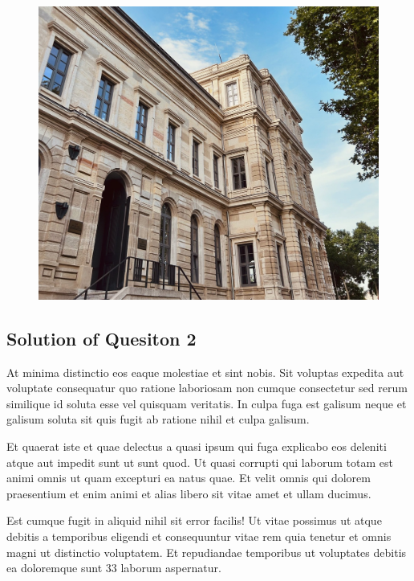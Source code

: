 \documentclass[11pt]{article}
\begin{document}
\begin{figure}[h!]
  \centering
  \includegraphics[width=1\linewidth]{figures/itu_example_photo.jpg}
\end{figure}

\subsection*{Solution of Quesiton 2}

At minima distinctio eos eaque molestiae et sint nobis. Sit voluptas expedita aut voluptate consequatur quo ratione laboriosam non cumque consectetur sed rerum similique id soluta esse vel quisquam veritatis. In culpa fuga est galisum neque et galisum soluta sit quis fugit ab ratione nihil et culpa galisum.

Et quaerat iste et quae delectus a quasi ipsum qui fuga explicabo eos deleniti atque aut impedit sunt ut sunt quod. Ut quasi corrupti qui laborum totam est animi omnis ut quam excepturi ea natus quae. Et velit omnis qui dolorem praesentium et enim animi et alias libero sit vitae amet et ullam ducimus.

Est cumque fugit in aliquid nihil sit error facilis! Ut vitae possimus ut atque debitis a temporibus eligendi et consequuntur vitae rem quia tenetur et omnis magni ut distinctio voluptatem. Et repudiandae temporibus ut voluptates debitis ea doloremque sunt 33 laborum aspernatur.
\end{document}
